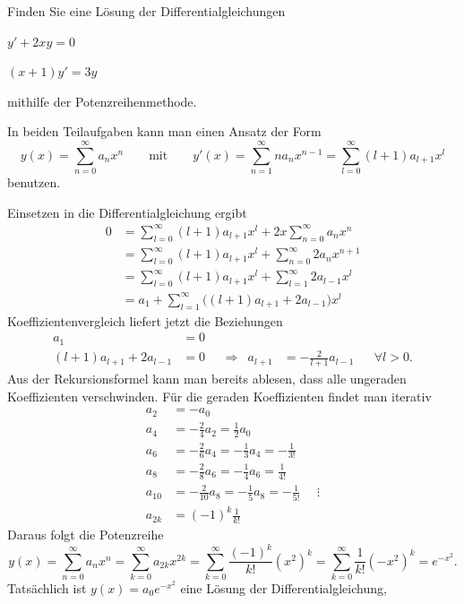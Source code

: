 Finden Sie eine Lösung der Differentialgleichungen
\begin{teilaufgaben}
\item $y'+2xy=0$
\item $(x+1)y'=3y$
\end{teilaufgaben}
mithilfe der Potenzreihenmethode.

\begin{loesung}
In beiden Teilaufgaben kann man einen Ansatz der Form
\[
y(x)
=
\sum_{n=0}^\infty a_n x^n
\qquad\text{mit}\qquad
y'(x)
=
\sum_{n=1}^\infty na_n x^{n-1}
=
\sum_{l=0}^\infty (l+1)a_{l+1} x^l
\]
benutzen.
\begin{teilaufgaben}
\item
Einsetzen in die Differentialgleichung ergibt
\begin{align*}
0
&=
\sum_{l=0}^\infty (l+1)a_{l+1} x^l
+2x
\sum_{n=0}^\infty a_n x^n
\\
&=
\sum_{l=0}^\infty (l+1)a_{l+1} x^l
+
\sum_{n=0}^\infty 2a_n x^{n+1}
\\
&=
\sum_{l=0}^\infty (l+1)a_{l+1} x^l
+
\sum_{l=1}^\infty 2a_{l-1} x^l
\\
&=
a_1
+
\sum_{l=1}^\infty \bigl((l+1)a_{l+1} + 2a_{l-1}\bigr)x^l
\end{align*}
Koeffizientenvergleich liefert jetzt 
die Beziehungen
\begin{align*}
a_1
&=
0
\\
(l+1)a_{l+1} + 2a_{l-1}
&=
0
&&\Rightarrow&
a_{l+1} &= -\frac{2}{l+1} a_{l-1}
&&\forall l > 0.
\end{align*}
Aus der Rekursionsformel kann man bereits ablesen, dass alle
ungeraden Koeffizienten verschwinden.
Für die geraden Koeffizienten findet man iterativ
\begin{align*}
a_2 &= -a_0 \\
a_4 &= -\frac{2}{4} a_2 = \frac12 a_0 \\
a_6 &= -\frac{2}{6} a_4 = -\frac{1}{3} a_4 = -\frac{1}{3!} \\
a_8 &= -\frac{2}{8} a_6 = -\frac{1}{4} a_6 = \frac{1}{4!} \\
a_{10} &= -\frac{2}{10} a_8 = -\frac{1}{5} a_8 = -\frac{1}{5!}
 &\phantom{a}\vdots \\
a_{2k} &= (-1)^k\frac{1}{k!}
\end{align*}
Daraus folgt die Potenzreihe
\[
y(x)
=
\sum_{n=0}^\infty
a_n x^n
=
\sum_{k=0}^\infty
a_{2k} x^{2k}
=
\sum_{k=0}^\infty
\frac{(-1)^k}{k!} (x^2)^k
=
\sum_{k=0}^\infty
\frac{1}{k!} (-x^2)^k
=
e^{-x^2}.
\]
Tatsächlich ist $y(x)=a_0e^{-x^2}$ eine Lösung der Differentialgleichung,

\end{teilaufgaben}
\end{loesung}
